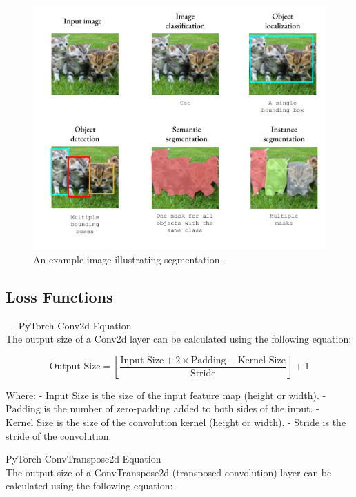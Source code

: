 \documentclass{article}
\begin{document}
\begin{figure}[H]
    \centering
    \includegraphics[width=\linewidth]{../fig/segmentation_explain.png} %
    \caption{An example image illustrating segmentation.}
    \label{fig:example}
\end{figure}

\subsection{Loss Functions}

--- PyTorch Conv2d Equation \\

The output size of a Conv2d layer can be calculated using the following equation:

\[ \text{Output Size} = \left\lfloor \frac{\text{Input Size} + 2 \times \text{Padding} - \text{Kernel Size}}{\text{Stride}} \right\rfloor + 1 \]

Where:
- \(\text{Input Size}\) is the size of the input feature map (height or width).
- \(\text{Padding}\) is the number of zero-padding added to both sides of the input.
- \(\text{Kernel Size}\) is the size of the convolution kernel (height or width).
- \(\text{Stride}\) is the stride of the convolution.

PyTorch ConvTranspose2d Equation\\

The output size of a ConvTranspose2d (transposed convolution) layer can be calculated using the following equation:
\end{document}
